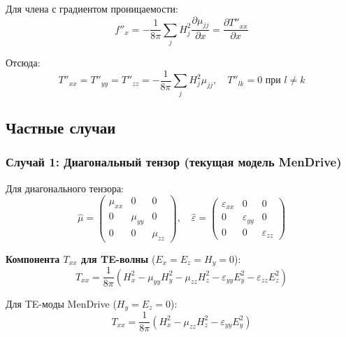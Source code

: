 \documentclass[a4paper,12pt]{article}
\begin{document}
Для члена с градиентом проницаемости:
\begin{equation}
f''_x = -\frac{1}{8\pi}\sum_j H_j^2 \frac{\partial\mu_{jj}}{\partial x} = \frac{\partial T''_{xx}}{\partial x}
\label{eq:tensor_double_prime}
\end{equation}

Отсюда:
\begin{equation}
T''_{xx} = T''_{yy} = T''_{zz} = -\frac{1}{8\pi}\sum_j H_j^2 \mu_{jj}, \quad T''_{lk} = 0 \text{ при } l \neq k
\label{eq:tensor_double_prime_components}
\end{equation}

\subsection{Частные случаи}

\subsubsection{Случай 1: Диагональный тензор (текущая модель MenDrive)}

Для диагонального тензора:
\begin{equation}
\hat{\mu} = \begin{pmatrix} \mu_{xx} & 0 & 0 \\ 0 & \mu_{yy} & 0 \\ 0 & 0 & \mu_{zz} \end{pmatrix}, \quad
\hat{\varepsilon} = \begin{pmatrix} \varepsilon_{xx} & 0 & 0 \\ 0 & \varepsilon_{yy} & 0 \\ 0 & 0 & \varepsilon_{zz} \end{pmatrix}
\label{eq:diagonal_tensor}
\end{equation}

\textbf{Компонента $T_{xx}$ для TE-волны} ($E_x = E_z = H_y = 0$):
\begin{equation}
\boxed{T_{xx} = \frac{1}{8\pi}\left(H_x^2 - \mu_{yy}H_y^2 - \mu_{zz}H_z^2 - \varepsilon_{yy}E_y^2 - \varepsilon_{zz}E_z^2\right)}
\label{eq:txx_diagonal_te}
\end{equation}

Для TE-моды MenDrive ($H_y = E_z = 0$):
\begin{equation}
T_{xx} = \frac{1}{8\pi}\left(H_x^2 - \mu_{zz}H_z^2 - \varepsilon_{yy}E_y^2\right)
\label{eq:txx_diagonal_te_simplified}
\end{equation}
\end{document}

